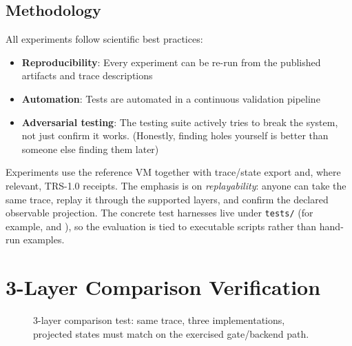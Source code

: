 \subsection{Methodology}

All experiments follow scientific best practices:
\begin{itemize}
    \item \textbf{Reproducibility}: Every experiment can be re-run from the published artifacts and trace descriptions
    \item \textbf{Automation}: Tests are automated in a continuous validation pipeline
    \item \textbf{Adversarial testing}: The testing suite actively tries to break the system, not just confirm it works. (Honestly, finding holes yourself is better than someone else finding them later)
\end{itemize}

Experiments use the reference VM together with trace/state export and, where relevant, TRS-1.0 receipts. The emphasis is on \textit{replayability}: anyone can take the same trace, replay it through the supported layers, and confirm the declared observable projection.
The concrete test harnesses live under \texttt{tests/} (for example,  and ), so the evaluation is tied to executable scripts rather than hand-run examples.

\section{3-Layer Comparison Verification}

\begin{figure}[h]
\centering
{}
\caption{3-layer comparison test: same trace, three implementations, projected states must match on the exercised gate/backend path.}
\label{fig:iso-test-arch}
\end{figure}

